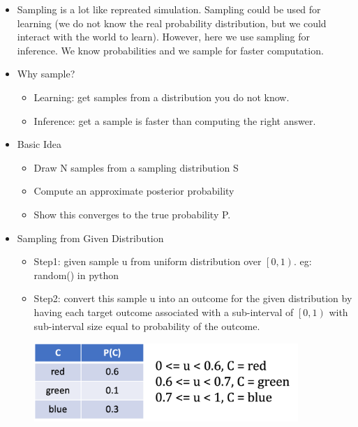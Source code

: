 \documentclass[11pt,a4paper]{report}
\begin{document}
\begin{itemize}
    \item Sampling is a lot like repreated simulation. Sampling could be used for learning (we do not know the real probability distribution, but we could interact with the world to learn). However, here we use sampling for inference. We know probabilities and we sample for faster computation.
    
    \item Why sample?
        \begin{itemize}
            \item Learning: get samples from a distribution you do not know.
            \item Inference: get a sample is faster than computing the right answer.
        \end{itemize}

    \item Basic Idea
        \begin{itemize}
            \item Draw N samples from a sampling distribution S
            \item Compute an approximate posterior probability
            \item Show this converges to the true probability P.
        \end{itemize}

    \item Sampling from Given Distribution
        \begin{itemize}
            \item Step1: given sample u from uniform distribution over $\left[0, 1 \right)$. eg: random() in python
            \item Step2: convert this sample u into an outcome for the given distribution by having each target outcome associated with a sub-interval of $\left[0, 1 \right)$ with sub-interval size equal to probability of the outcome.
            
            \includegraphics[width=10cm, height = 3cm]{sampling.png}
        \end{itemize}
\end{itemize}
\end{document}
